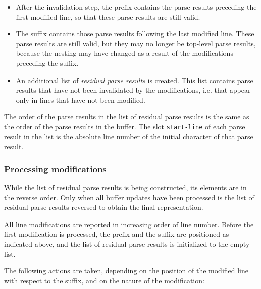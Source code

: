 \begin{itemize}
\item After the invalidation step, the prefix contains the parse
  results preceding the first modified line, so that these parse
  results are still valid.
\item The suffix contains those parse results following the last
  modified line.  These parse results are still valid, but they may no
  longer be top-level parse results, because the nesting may have
  changed as a result of the modifications preceding the suffix.
\item An additional list of \emph{residual parse results} is created.
  This list contains parse results that have not been invalidated by
  the modifications, i.e. that appear only in lines that have not been
  modified.
\end{itemize}

The order of the parse results in the list of residual parse results
is the same as the order of the parse results in the buffer.  The slot
\texttt{start-line} of each parse result in the list is the absolute
line number of the initial character of that parse result.

\subsubsection{Processing modifications}

While the list of residual parse results is being constructed, its
elements are in the reverse order.  Only when all buffer updates have
been processed is the list of residual parse results reversed to
obtain the final representation.

All line modifications are reported in increasing order of line
number.  Before the first modification is processed, the prefix and
the suffix are positioned as indicated above, and the list of residual
parse results is initialized to the empty list.

The following actions are taken, depending on the position of the
modified line with respect to the suffix, and on the nature of the
modification:

